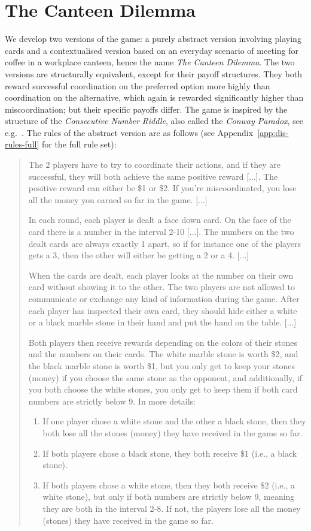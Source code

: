 \section{The Canteen Dilemma}
We develop two versions of the game: a purely abstract version involving playing cards and a contextualised version based on an everyday scenario of meeting for coffee in a workplace canteen, hence the name \emph{The Canteen Dilemma}. The two versions are structurally equivalent, except for their payoff structures. They both reward successful coordination on the preferred option more highly than coordination on the alternative, which again is rewarded significantly higher than miscoordination; but their specific payoffs differ. The game is inspired by the structure of the \emph{Consecutive Number Riddle}, also called the \emph{Conway Paradox}, see e.g.\ \cite{van1980conway,van2015one}.
The rules of the abstract version are as follows (see Appendix~\ref{app:dis-rules-full} for the full rule set): 
\begin{quote}
\indent
The 2 players have to try to coordinate their actions, and if they are successful, they will both achieve the same positive reward [...]. The positive reward can either be \$1 or \$2. If you’re miscoordinated, you lose all the money you earned so far in the game. [...] 
  
In each round, each player is dealt a face down card. On the face of the card there is a number in the interval 2-10 [...]. The numbers on the two dealt cards are always exactly 1 apart, so if for instance one of the players gets a 3, then the other will either be getting a 2 or a 4. [...] 

When the cards are dealt, each player looks at the number on their own card without showing it to the other. The two players are not allowed to communicate or exchange any kind of information during the game. After each player has inspected their own card, they should hide either a white or a black marble stone in their hand and put the hand on the table. [...] 

Both players then receive rewards depending on the colors of their stones and the numbers on their cards. The white marble stone is worth \$2, and the black marble stone is worth \$1, but you only get to keep your stones (money) if you choose the same stone as the opponent, and additionally, if you both choose the white stones, you only get to keep them if both card numbers are strictly below 9. In more details:  
\begin{enumerate}
  \item[a)] If one player chose a white stone and the other a black stone, then they both lose all the stones (money) they have received in the game so far.    
  \item[b)] If both players chose a black stone, they both receive \$1 (i.e., a black stone). 
  \item[c)] If both players chose a white stone, then they both receive \$2 (i.e., a white stone), but only if both numbers are strictly below 9, meaning they are both in the interval 2-8. If not, the players lose all the money (stones) they have received in the game so far.
\end{enumerate}
\end{quote}
